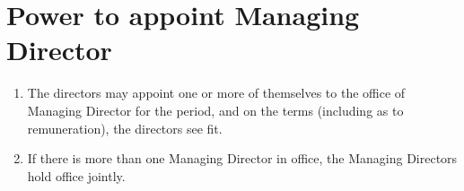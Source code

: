\section{Power to appoint Managing Director}

\begin{enumerate}[label=(\alph*)]
    \item The directors may appoint one or more of themselves to the office of Managing Director for the period, and on the terms (including as to remuneration), the directors see fit.
    
    \item If there is more than one Managing Director in office, the Managing Directors hold office jointly.
\end{enumerate} 